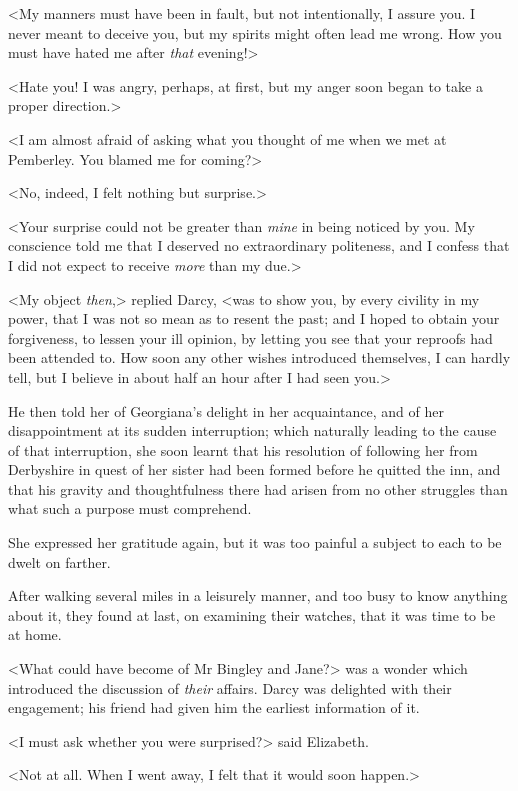 <My manners must have been in fault, but not intentionally, I assure you. I never meant to deceive you, but my spirits might often lead me wrong. How you must have hated me after \textit{that} evening!>

<Hate you! I was angry, perhaps, at first, but my anger soon began to take a proper direction.>

<I am almost afraid of asking what you thought of me when we met at Pemberley. You blamed me for coming?>

<No, indeed, I felt nothing but surprise.>

<Your surprise could not be greater than \textit{mine} in being noticed by you. My conscience told me that I deserved no extraordinary politeness, and I confess that I did not expect to receive \textit{more} than my due.>

<My object \textit{then},> replied Darcy, <was to show you, by every civility in my power, that I was not so mean as to resent the past; and I hoped to obtain your forgiveness, to lessen your ill opinion, by letting you see that your reproofs had been attended to. How soon any other wishes introduced themselves, I can hardly tell, but I believe in about half an hour after I had seen you.>

He then told her of Georgiana's delight in her acquaintance, and of her disappointment at its sudden interruption; which naturally leading to the cause of that interruption, she soon learnt that his resolution of following her from Derbyshire in quest of her sister had been formed before he quitted the inn, and that his gravity and thoughtfulness there had arisen from no other struggles than what such a purpose must comprehend.

She expressed her gratitude again, but it was too painful a subject to each to be dwelt on farther.

After walking several miles in a leisurely manner, and too busy to know anything about it, they found at last, on examining their watches, that it was time to be at home.

<What could have become of Mr Bingley and Jane?> was a wonder which introduced the discussion of \textit{their} affairs. Darcy was delighted with their engagement; his friend had given him the earliest information of it.

<I must ask whether you were surprised?> said Elizabeth.

<Not at all. When I went away, I felt that it would soon happen.>

